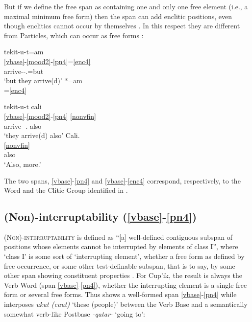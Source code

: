 \documentclass[output=paper]{langscibook}
\begin{document}
But if we define the free span as containing one and only one free element (i.e., a maximal minimum free form) then the span can add enclitic positions, even though enclitics cannot occur by themselves . In this respect they are different from Particles, which can occur as free forms :

 \ea\label{ex:key:23}
     \ea\label{ex:key:23a}
     \glll tekit-u-t=am\\
         \ref{vbase}-\ref{mood2}-\ref{pn4}=\ref{enc4} \\
       arrive-\Ind{}-\Tpl.\Sarg{}=but \\
     \glt `but they arrive(d)'
      \ex\label{ex:key:23b} 
      *=am \\
      =\ref{enc4} \\
  \z
 \z

\ea\label{ex:key:24}
    \ea\label{ex:key:24a}
    \glll tekit-u-t cali\\
        \ref{vbase}-\ref{mood2}-\ref{pn4} \ref{nonvfin} \\
         arrive-\Ind{}-\Tpl.\Sarg{} also\\
    \glt `they arrive(d) also'
    \ex\label{ex:key:24b}
    \glll Cali.\\
        \ref{nonvfin} \\
        also\\
    \glt `Also, more.'
    \z
\z

The two spans, \ref{vbase}-\ref{pn4} and \ref{vbase}-\ref{enc4} correspond, respectively, to the Word and the Clitic Group identified in .

\subsection{(Non)-interruptability (\ref{vbase}-\ref{pn4})} \label{sec:5.2}

\textsc{(Non)-interruptability} is defined as ``[a] well-defined contiguous subspan of positions whose elements cannot be interrupted by elements of class I'', where `class I' is some sort of `interrupting element', whether a free form as defined by free occurrence, or some other test-definable subspan, that is to say, by some other span showing constituent properties \citep[16]{Tallman2021}. For Cup'ik, the result is always the Verb Word (span \ref{vbase}-\ref{pn4}), whether the interrupting element is a single free form or several free forms. Thus  shows a well-formed span \ref{vbase}-\ref{pn4} while  interposes \textit{ukut (cuut)} `these (people)' between the Verb Base and a semantically somewhat verb-like Postbase \textit{{}-qatar-} `going to':
\end{document}
